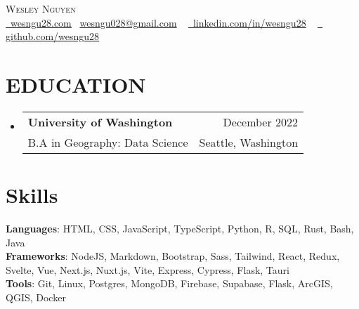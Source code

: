 \documentclass[letterpaper,11pt]{article}
\makeatletter
\newcommand{\resumeSubheading}[4]{
  \vspace{-2pt}\item
    \begin{tabular*}{0.97\textwidth}[t]{l@{\extracolsep{\fill}}r}
      \textbf{#1} & #2 \\
      {\small#3} & {\small #4} \\
    \end{tabular*}\vspace{-7pt}
}
\newcommand{\resumeSubHeadingListStart}{\begin{itemize}[leftmargin=0.15in, label={}]}
\newcommand{\resumeSubHeadingListEnd}{\end{itemize}}
\makeatother
\begin{document}

\begin{center}
    {\Huge \scshape Wesley Nguyen} \\ \vspace{4pt}\href{https://wesngu28.com}{\raisebox{-0.2\height}\ \underline{wesngu28.com}} {\raisebox{-0.2\height}\  \underline{wesngu028@gmail.com}} ~
    \href{https://linkedin.com/in/wesngu28/}{\raisebox{-0.2\height}\ \underline{linkedin.com/in/wesngu28}}  ~
    \href{https://github.com/wesngu28}{\raisebox{-0.2\height}\ \underline{ github.com/wesngu28}}
    \vspace{-8pt}
\end{center}


\section{EDUCATION}
  \resumeSubHeadingListStart
    \resumeSubheading
      {University of Washington}{December 2022}
      {B.A in Geography: Data Science}{Seattle, Washington}
  \resumeSubHeadingListEnd

\section{Skills}
 \begin{itemize}[leftmargin=0.15in, label={}]
    \small{\item{
     \textbf{Languages}{: HTML, CSS, JavaScript, TypeScript, Python, R, SQL, Rust, Bash, Java} \\
     \vspace{3pt}
     \textbf{Frameworks}{: NodeJS, Markdown, Bootstrap, Sass, Tailwind, React, Redux, Svelte, Vue, Next.js, Nuxt.js, Vite, Express, Cypress, Flask, Tauri} \\
     \vspace{3pt}
     \textbf{Tools}{: Git, Linux, Postgres, MongoDB, Firebase, Supabase, Flask, ArcGIS, QGIS, Docker} \\
    }}
 \end{itemize}
\end{document}
